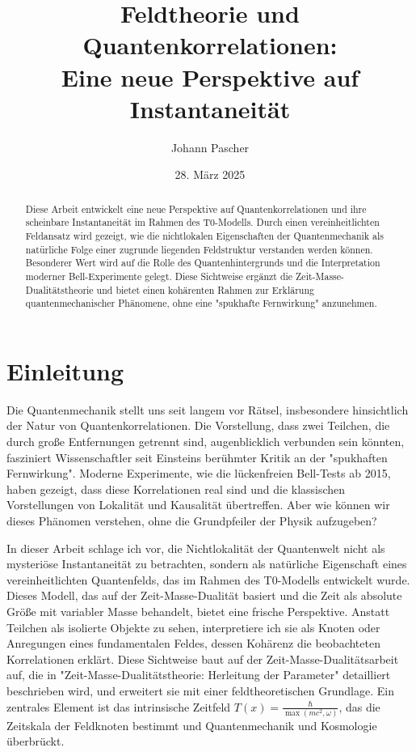 \documentclass[a4paper,12pt]{article}
\title{Feldtheorie und Quantenkorrelationen: \\Eine neue Perspektive auf Instantaneität}
\author{Johann Pascher}
\date{28. März 2025}
\newcommand{\Tfield}{T(x)}
\theoremstyle{definition}
\theoremstyle{remark}
\begin{document}
	
	\maketitle
	
	\begin{abstract}
		Diese Arbeit entwickelt eine neue Perspektive auf Quantenkorrelationen und ihre scheinbare Instantaneität im Rahmen des T0-Modells. Durch einen vereinheitlichten Feldansatz wird gezeigt, wie die nichtlokalen Eigenschaften der Quantenmechanik als natürliche Folge einer zugrunde liegenden Feldstruktur verstanden werden können. Besonderer Wert wird auf die Rolle des Quantenhintergrunds und die Interpretation moderner Bell-Experimente gelegt. Diese Sichtweise ergänzt die Zeit-Masse-Dualitätstheorie und bietet einen kohärenten Rahmen zur Erklärung quantenmechanischer Phänomene, ohne eine "spukhafte Fernwirkung" anzunehmen.
	\end{abstract}
	
	\tableofcontents
	\newpage
	
	\section{Einleitung}
	
	Die Quantenmechanik stellt uns seit langem vor Rätsel, insbesondere hinsichtlich der Natur von Quantenkorrelationen. Die Vorstellung, dass zwei Teilchen, die durch große Entfernungen getrennt sind, augenblicklich verbunden sein könnten, fasziniert Wissenschaftler seit Einsteins berühmter Kritik an der "spukhaften Fernwirkung". Moderne Experimente, wie die lückenfreien Bell-Tests ab 2015, haben gezeigt, dass diese Korrelationen real sind und die klassischen Vorstellungen von Lokalität und Kausalität übertreffen. Aber wie können wir dieses Phänomen verstehen, ohne die Grundpfeiler der Physik aufzugeben?
	
	In dieser Arbeit schlage ich vor, die Nichtlokalität der Quantenwelt nicht als mysteriöse Instantaneität zu betrachten, sondern als natürliche Eigenschaft eines vereinheitlichten Quantenfelds, das im Rahmen des T0-Modells entwickelt wurde. Dieses Modell, das auf der Zeit-Masse-Dualität basiert und die Zeit als absolute Größe mit variabler Masse behandelt, bietet eine frische Perspektive. Anstatt Teilchen als isolierte Objekte zu sehen, interpretiere ich sie als Knoten oder Anregungen eines fundamentalen Feldes, dessen Kohärenz die beobachteten Korrelationen erklärt. Diese Sichtweise baut auf der Zeit-Masse-Dualitätsarbeit auf, die in "Zeit-Masse-Dualitätstheorie: Herleitung der Parameter" \cite{pascher_params_2025} detailliert beschrieben wird, und erweitert sie mit einer feldtheoretischen Grundlage. Ein zentrales Element ist das intrinsische Zeitfeld \(\Tfield = \frac{\hbar}{\max(m c^2, \omega)}\), das die Zeitskala der Feldknoten bestimmt und Quantenmechanik und Kosmologie überbrückt.
	
\end{document}
